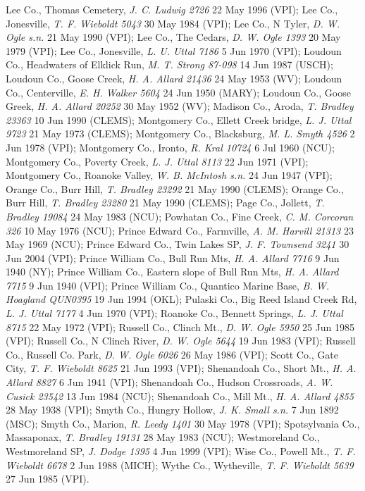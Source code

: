 \documentclass{article}
\begin{document}
Lee Co., Thomas Cemetery, \textit{J. C. Ludwig 2726} 22 May 1996 (VPI);
Lee Co., Jonesville, \textit{T. F. Wieboldt 5043} 30 May 1984 (VPI);
Lee Co., N Tyler, \textit{D. W. Ogle s.n.} 21 May 1990 (VPI);
Lee Co., The Cedars, \textit{D. W. Ogle 1393} 20 May 1979 (VPI);
Lee Co., Jonesville, \textit{L. U. Uttal 7186} 5 Jun 1970 (VPI);
Loudoun Co., Headwaters of Elklick Run, \textit{M. T. Strong 87-098} 14 Jun 1987 (USCH);
Loudoun Co., Goose Creek, \textit{H. A. Allard 21436} 24 May 1953 (WV);
Loudoun Co., Centerville, \textit{E. H. Walker 5604} 24 Jun 1950 (MARY);
Loudoun Co., Goose Greek, \textit{H. A. Allard 20252} 30 May 1952 (WV);
Madison Co., Aroda, \textit{T. Bradley 23363} 10 Jun 1990 (CLEMS);
Montgomery Co., Ellett Creek bridge, \textit{L. J. Uttal 9723} 21 May 1973 (CLEMS);
Montgomery Co., Blacksburg, \textit{M. L. Smyth 4526} 2 Jun 1978 (VPI);
Montgomery Co., Ironto, \textit{R. Kral 10724} 6 Jul 1960 (NCU);
Montgomery Co., Poverty Creek, \textit{L. J. Uttal 8113} 22 Jun 1971 (VPI);
Montgomery Co., Roanoke Valley, \textit{W. B. McIntosh s.n.} 24 Jun 1947 (VPI);
Orange Co., Burr Hill, \textit{T. Bradley 23292} 21 May 1990 (CLEMS);
Orange Co., Burr Hill, \textit{T. Bradley 23280} 21 May 1990 (CLEMS);
Page Co., Jollett, \textit{T. Bradley 19084} 24 May 1983 (NCU);
Powhatan Co., Fine Creek, \textit{C. M. Corcoran 326} 10 May 1976 (NCU);
Prince Edward Co., Farmville, \textit{A. M. Harvill 21313} 23 May 1969 (NCU);
Prince Edward Co., Twin Lakes SP, \textit{J. F. Townsend 3241} 30 Jun 2004 (VPI);
Prince William Co., Bull Run Mts, \textit{H. A. Allard 7716} 9 Jun 1940 (NY);
Prince William Co., Eastern slope of Bull Run Mts, \textit{H. A. Allard 7715} 9 Jun 1940 (VPI);
Prince William Co., Quantico Marine Base, \textit{B. W. Hoagland QUN0395} 19 Jun 1994 (OKL);
Pulaski Co., Big Reed Island Creek Rd, \textit{L. J. Uttal 7177} 4 Jun 1970 (VPI);
Roanoke Co., Bennett Springs, \textit{L. J. Uttal 8715} 22 May 1972 (VPI);
Russell Co., Clinch Mt., \textit{D. W. Ogle 5950} 25 Jun 1985 (VPI);
Russell Co., N Clinch River, \textit{D. W. Ogle 5644} 19 Jun 1983 (VPI);
Russell Co., Russell Co. Park, \textit{D. W. Ogle 6026} 26 May 1986 (VPI);
Scott Co., Gate City, \textit{T. F. Wieboldt 8625} 21 Jun 1993 (VPI);
Shenandoah Co., Short Mt., \textit{H. A. Allard 8827} 6 Jun 1941 (VPI);
Shenandoah Co., Hudson Crossroads, \textit{A. W. Cusick 23542} 13 Jun 1984 (NCU);
Shenandoah Co., Mill Mt., \textit{H. A. Allard 4855} 28 May 1938 (VPI);
Smyth Co., Hungry Hollow, \textit{J. K. Small s.n.} 7 Jun 1892 (MSC);
Smyth Co., Marion, \textit{R. Leedy 1401} 30 May 1978 (VPI);
Spotsylvania Co., Massaponax, \textit{T. Bradley 19131} 28 May 1983 (NCU);
Westmoreland Co., Westmoreland SP, \textit{J. Dodge 1395} 4 Jun 1999 (VPI);
Wise Co., Powell Mt., \textit{T. F. Wieboldt 6678} 2 Jun 1988 (MICH);
Wythe Co., Wytheville, \textit{T. F. Wieboldt 5639} 27 Jun 1985 (VPI).
\end{document}

